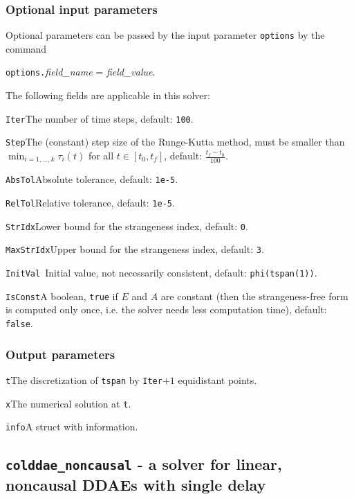\documentclass[final,reqno]{siamltex}
\renewenvironment{itemize}[1]{\begin{compactitem}#1}{\end{compactitem}}
\begin{document}
\subsubsection{Optional input parameters}
Optional parameters can be passed by the input parameter {\tt options} by the command 
\begin{center}
{\tt options.}{\it field\_name} = {\it field\_value}.
\end{center}
The following fields are applicable in this solver:
\begin{itemize}
\item {\tt Iter}\quad        The number of time steps, default: {\tt 100}.
\item {\tt Step}\quad        The (constant) step size of the Runge-Kutta method, must be smaller than
          $\min_{i=1,\ldots,k}\tau_i(t)$ for all $t\in[t_0,t_f]$, default: $\frac{t_f-t_0}{100}$.
\item {\tt AbsTol}\quad       Absolute tolerance, default:  {\tt 1e-5}.
\item {\tt RelTol}\quad       Relative tolerance, default:  {\tt 1e-5}.
\item {\tt StrIdx}\quad       Lower bound for the strangeness index,  default: {\tt 0}.
\item {\tt MaxStrIdx}\quad    Upper bound for the strangeness index,  default: {\tt 3}.
\item {\tt InitVal  }\quad    Initial value, not necessarily consistent,  default: {\tt phi(tspan(1))}.
\item {\tt IsConst}\quad      A boolean, {\tt true} if $E$ and $A$ are constant (then the strangeness-free form is computed only once, i.e. the solver needs less computation time), default: {\tt false}.
\end{itemize}

\subsubsection{Output parameters}
\begin{itemize}
\item {\tt t}\quad The discretization of {\tt tspan} by {\tt Iter}$+1$ equidistant points.
\item {\tt x}\quad The numerical solution at {\tt t}.
\item {\tt info}\quad A struct with information.
\end{itemize}


\subsection{{\tt colddae\_noncausal} - a solver for linear, noncausal DDAEs with single delay}
\end{document}
